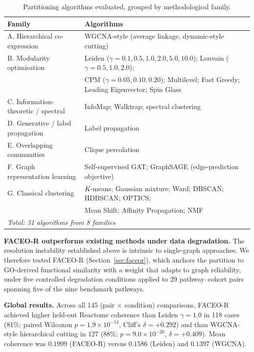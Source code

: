\documentclass[twocolumn,10pt,letterpaper]{article}
\begin{document}
\begin{table}[t]
\centering
\caption{Partitioning algorithms evaluated, grouped by methodological family.}
\label{tab:algos}
\normalsize
\begin{tabular}{ll}
\toprule
Family & Algorithms \\
\midrule
A. Hierarchical co-expression & WGCNA-style (average linkage, dynamic-style cutting) \\
B. Modularity optimisation & Leiden ($\gamma=0.1,0.5,1.0,2.0,5.0,10.0$); Louvain ($\gamma=0.5,1.0,2.0$); \\
 & CPM ($\gamma=0.05,0.10,0.20$); Multilevel; Fast Greedy; Leading Eigenvector; Spin Glass \\
C. Information-theoretic / spectral & InfoMap; Walktrap; spectral clustering \\
D. Generative / label propagation & Label propagation \\
E. Overlapping communities & Clique percolation \\
F. Graph representation learning & Self-supervised GAT; GraphSAGE (edge-prediction objective) \\
G. Classical clustering & $K$-means; Gaussian mixture; Ward; DBSCAN; HDBSCAN; OPTICS; \\
 & Mean Shift; Affinity Propagation; NMF \\
\midrule
\multicolumn{2}{l}{\emph{Total: 31 algorithms from 8 families}} \\
\bottomrule
\end{tabular}
\end{table}

\noindent\textbf{FACEO-R outperforms existing methods under data degradation.} The resolution instability established above is intrinsic to single-graph approaches. We
therefore tested FACEO-R (Section~\ref{sec:faceor}), which anchors the partition to
GO-derived functional similarity with a weight that adapts to graph reliability, under five
controlled degradation conditions applied to 29 pathway--cohort pairs spanning five of the
nine benchmark pathways.

\noindent\textbf{Global results.} Across all 145 (pair $\times$ condition) comparisons,
FACEO-R achieved higher held-out Reactome coherence than Leiden $\gamma=1.0$ in 118 cases
(81\%; paired Wilcoxon $p = 1.9\times10^{-14}$, Cliff's $\delta = +0.292$) and than
WGCNA-style hierarchical cutting in 127 (88\%; $p = 9.0\times10^{-20}$,
$\delta = +0.409$). Mean coherence was $0.1999$ (FACEO-R) versus $0.1586$ (Leiden) and
$0.1397$ (WGCNA).
\end{document}

